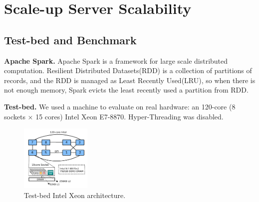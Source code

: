 
\section{Scale-up Server Scalability}
\label{sec:scale}

\subsection{Test-bed and Benchmark}

\ifkor
\noindent
\textbf{Apache Spark. }
Apache Spark is a framework for large scale distributed computation.
Resilient Distributed Datasets(RDD) is a collection of partitions of records, 
and the RDD is managed as Least Recently Used(LRU), so when there is not enough
memory, Spark evicts the least recently used a partition from RDD.


\else
\fi

\ifkor
\noindent
\textbf{Test-bed. }
We used a machine to evaluate on real hardware: an 120-core (8 sockets × 15
cores) Intel Xeon E7-8870.
Hyper-Threading was disabled.


\begin{figure}[h]
  \begin{center}
     \includegraphics[width=0.3\textwidth]{fig/xeon}
  \end{center}
  \caption{Test-bed Intel Xeon architecture.}
  \label{fig:basic}
\end{figure}
\else

